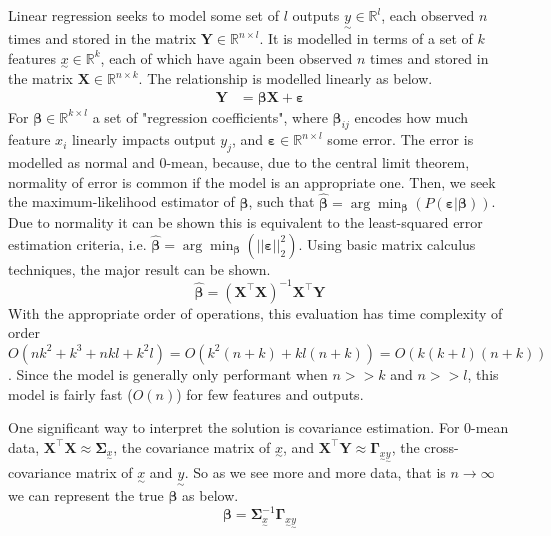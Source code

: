 \documentclass[12pt,a4paper]{article} %
\newcommand{\ve}[1]{\underset{\sim}{#1}}
\begin{document}
Linear regression seeks to model some set of $l$ outputs $\ve{y}\in\mathbb{R}^l$, each observed $n$ times and stored in the matrix $\pmb{Y}\in\mathbb{R}^{n\times l}$. It is modelled in terms of a set of $k$ features $\ve{x}\in\mathbb{R}^k$, each of which have again been observed $n$ times and stored in the matrix $\pmb{X}\in\mathbb{R}^{n\times k}$. The relationship is modelled linearly as below.
\begin{align*}
    \pmb{Y}&=\pmb{\beta X} + \pmb{\varepsilon}
\end{align*}
For $\pmb{\beta}\in\mathbb{R}^{k\times l}$ a set of "regression coefficients", where $\pmb{\beta}_{ij}$ encodes how much feature $x_i$ linearly impacts output $y_j$, and $\pmb{\varepsilon}\in\mathbb{R}^{n\times l}$ some error. The error is modelled as normal and 0-mean, because, due to the central limit theorem, normality of error is common if the model is an appropriate one. Then, we seek the maximum-likelihood estimator of $\pmb{\beta}$, such that $\pmb{\hat{\beta}}=\arg\min_{\pmb{\beta}}(P(\pmb{\varepsilon}|\pmb{\beta}))$. Due to normality it can be shown this is equivalent to the least-squared error estimation criteria, i.e. $\pmb{\hat{\beta}}=\arg\min_{\pmb{\beta}}(||\pmb{\varepsilon}||_2^2)$. Using basic matrix calculus techniques, the major result can be shown.
\[
    \pmb{\hat{\beta}}=(\pmb{X}^\top\pmb{X})^{-1}\pmb{X}^\top \pmb{Y}
\]
With the appropriate order of operations, this evaluation has time complexity of order $O(nk^2+k^3+nkl+k^2l)=O(k^2(n+k)+kl(n+k))=O(k(k+l)(n+k))$. Since the model is generally only performant when $n>>k$ and $n>>l$, this model is fairly fast ($O(n)$) for few features and outputs.

One significant way to interpret the solution is covariance estimation. For 0-mean data, $\pmb{X}^\top\pmb{X}\approx \pmb{\Sigma}_{\ve{x}}$, the covariance matrix of $\ve{x}$, and $\pmb{X}^\top\pmb{Y}\approx\pmb{\Gamma}_{\ve{x}\ve{y}}$, the cross-covariance matrix of $\ve{x}$ and $\ve{y}$. So as we see more and more data, that is $n\to\infty$ we can represent the true $\pmb{\beta}$ as below.
\[
    \pmb{\beta}=\pmb{\Sigma}_{\ve{x}}^{-1}\pmb{\Gamma}_{\ve{x}\ve{y}}
\]
\end{document}
